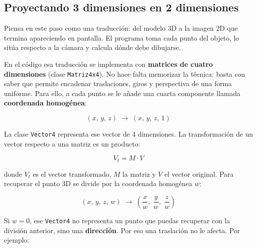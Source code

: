\documentclass[
  spanish,
  11pt,
  a4paper,
  DIV=11,
  numbers=noendperiod]{scrartcl}
\begin{document}
\subsection{Proyectando 3 dimensiones en 2 dimensiones}

\label{proyectando-3-dimensiones-en-2-dimensiones}

Piensa en este paso como una traducción: del modelo 3D a la imagen 2D que termina apareciendo en pantalla. El programa toma cada punto del objeto, lo sitúa respecto a la cámara y calcula dónde debe dibujarse.

En el código esa traducción se implementa con \textbf{matrices de cuatro dimensiones} (clase \texttt{Matriz4x4}). No hace falta memorizar la técnica: basta con saber que permite encadenar traslaciones, giros y perspectiva de una forma uniforme. Para ello, a cada punto se le añade una cuarta componente llamada \textbf{coordenada homogénea}:

\[
(x,\, y,\, z) \;\longrightarrow\; (x,\, y,\, z,\, 1)
\]

La clase \texttt{Vector4} representa ese vector de 4 dimensiones. La transformación de un vector respecto a una matriz es un producto:

\[
V_t = M \cdot V
\]

donde \(V_t\) es el vector transformado, \(M\) la matriz y \(V\) el vector original. Para recuperar el punto 3D se divide por la coordenada homogénea \(w\):

\[
(x,\, y,\, z,\, w) \;\longrightarrow\; \left(\frac{x}{w},\;\frac{y}{w},\;\frac{z}{w}\right)
\]

Si \(w = 0\), ese \texttt{Vector4} no representa un punto que puedas recuperar con la división anterior, sino una \textbf{dirección}. Por eso una traslación no le afecta. Por ejemplo:
\end{document}
